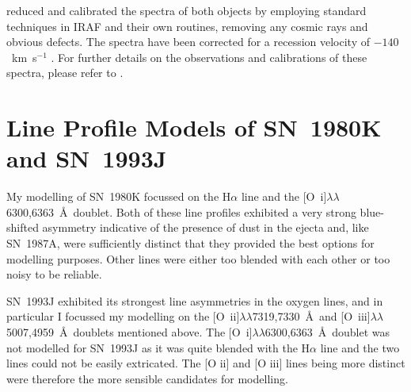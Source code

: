 \citet{Milisavljevic2012} reduced and calibrated the spectra of both objects by employing
standard techniques in IRAF and their own routines, removing any cosmic rays and obvious defects. The spectra have been corrected for a recession velocity of $-140$~km~s$^{-1}$ \citep{Matheson2000b}.  For further details on the observations and calibrations of these spectra, please refer to \citet{Milisavljevic2012}. 




\section{Line Profile Models of SN~1980K and SN~1993J}
\label{80K_93J_models}
My modelling of SN~1980K focussed on the H$\alpha$ line and the [O~{\sc i}]$\lambda\lambda$6300,6363~\AA\  doublet.  Both of these line profiles exhibited a very strong blue-shifted asymmetry indicative of the presence of dust in the ejecta and, like SN~1987A, were sufficiently distinct that they provided the best options for modelling purposes.  Other lines were either too blended with each other or too noisy to be reliable.  

SN~1993J exhibited its strongest line asymmetries in the oxygen lines, and in particular I focussed my modelling on the [O~{\sc ii}]$\lambda\lambda$7319,7330~\AA\  and [O~{\sc iii}]$\lambda\lambda$5007,4959~\AA\  doublets mentioned above.  The [O~{\sc i}]$\lambda\lambda$6300,6363~\AA\ doublet was not modelled for SN~1993J as it was quite blended with the H$\alpha$ line and the two lines could not be easily extricated.  The [O {\sc ii}] and [O {\sc iii}] lines being more distinct were therefore the more sensible candidates for modelling.

